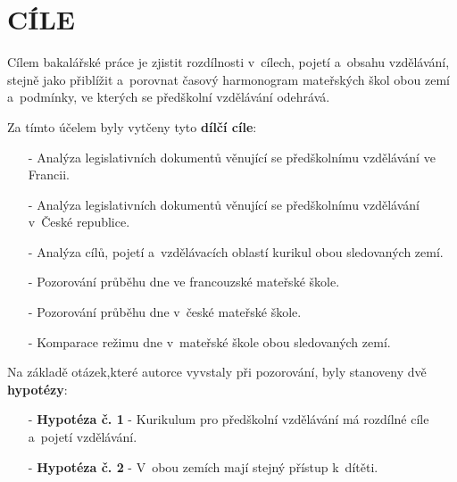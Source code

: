 \chapter{CÍLE}
\label{cile}
Cílem bakalářské práce je zjistit rozdílnosti v~cílech, pojetí a~obsahu vzdělávání, stejně jako přiblížit a~porovnat časový harmonogram mateřských škol obou zemí a~podmínky, ve kterých se předškolní vzdělávání odehrává. 

Za tímto účelem byly vytčeny tyto \textbf{dílčí cíle}:

\begin{itemize}
	\setlength\itemsep{-2mm}
	\item [-] Analýza legislativních dokumentů věnující se předškolnímu vzdělávání ve Francii.
	\item [-] Analýza legislativních dokumentů věnující se předškolnímu vzdělávání v~České republice.
	\item [-] Analýza cílů, pojetí a~vzdělávacích oblastí kurikul obou sledovaných zemí.
	\item [-] Pozorování průběhu dne ve francouzské mateřské škole.
	\item [-] Pozorování průběhu dne v~české mateřské škole. 
	\item [-] Komparace režimu dne v~mateřské škole obou sledovaných zemí.
\end{itemize}


Na základě otázek,které autorce vyvstaly při pozorování, byly stanoveny dvě \textbf{hypotézy}:

\begin{itemize}
\item[-] \textbf{Hypotéza č. 1} - Kurikulum pro předškolní vzdělávání má rozdílné cíle a~pojetí vzdělávání.
\item[-] \textbf{Hypotéza č. 2} - V~obou zemích mají stejný přístup k~dítěti. 
\end{itemize}
